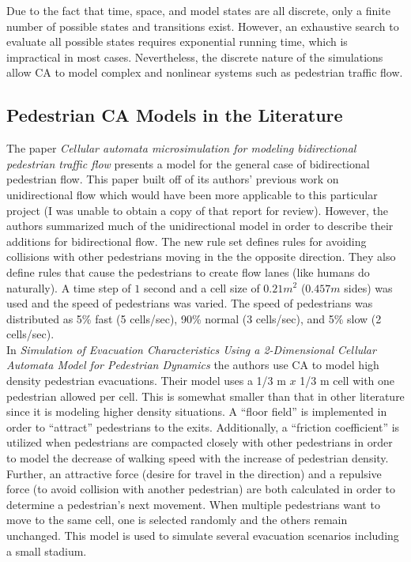 \documentclass[paper=a4, fontsize=11pt]{scrartcl}
\numberwithin{equation}{section}		%
\numberwithin{figure}{section}			%
\numberwithin{table}{section}		    %
\begin{document}
\noindent
Due to the fact that time, space, and model states are all discrete, only a finite number of 
possible states and transitions exist. However, an exhaustive search to evaluate all possible 
states requires exponential running time, which is impractical in most cases. Nevertheless, the 
discrete nature of the simulations allow CA to model complex and nonlinear systems such as 
pedestrian traffic flow.\\

\subsection{Pedestrian CA Models in the Literature}
The paper \emph{Cellular automata microsimulation for modeling bidirectional pedestrian traffic 
flow} \cite{blue2001cellular} presents a model for the general case of bidirectional pedestrian 
flow. This paper built off of its authors' previous work on unidirectional flow which would 
have been more applicable to this particular project (I was unable to obtain a copy of that 
report for review). However, the authors summarized much of the unidirectional model in order 
to describe their additions for bidirectional flow. The new rule set defines rules for avoiding 
collisions with other pedestrians moving in the the opposite direction. They also define rules 
that cause the pedestrians to create flow lanes (like humans do naturally). A time step of $1$ 
second and a cell size of $0.21 m^2$ ($0.457 m$ sides) was used and the speed of pedestrians 
was varied. The speed of pedestrians was distributed as 5\% fast (5 cells/sec), 90\% normal (3 
cells/sec), and 5\% slow (2 cells/sec).\\

\noindent
In \emph{Simulation of Evacuation Characteristics Using a 2-Dimensional Cellular Automata Model 
for Pedestrian Dynamics} \cite{ji2013simulation} the authors use CA to model high density 
pedestrian evacuations. Their model uses a 1/3 m $x$ 1/3 m cell with one pedestrian allowed 
per cell. This is somewhat smaller than that in other literature since it is modeling higher 
density situations. A ``floor field'' is implemented in order to ``attract'' pedestrians to the 
exits. Additionally, a ``friction coefficient'' is utilized when pedestrians are compacted 
closely with other pedestrians in order to model the decrease of walking speed with the 
increase of pedestrian density. Further, an attractive force (desire for travel in the 
direction) and a repulsive force (to avoid collision with another pedestrian) are both 
calculated in order to determine a pedestrian's next movement. When multiple pedestrians want 
to move to the same cell, one is selected randomly and the others remain unchanged. This model 
is used to simulate several evacuation scenarios including a small stadium.\\
\end{document}
